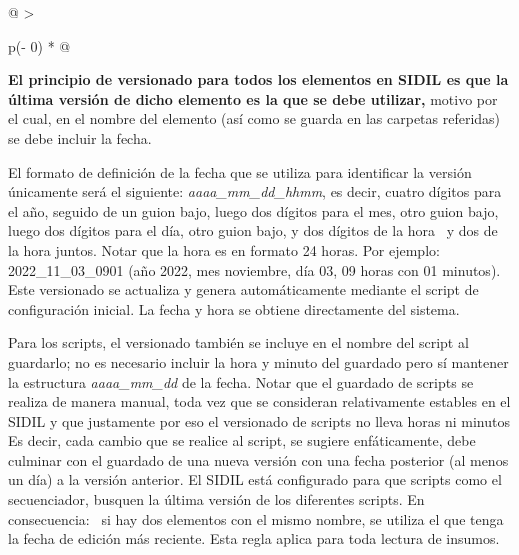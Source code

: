 \documentclass[
]{article}
\begin{document}
\begin{longtable}[]{@{}
  >{\raggedright\arraybackslash}p{(\columnwidth - 0\tabcolsep) * }@{}}
\caption{El versionado de los archivos no solo permite la trazabilidad (ver subsección siguiente) sino que además es indispensable para el funcionamiento adecuado del SIDIL. Dos ejemplos: primero, la lectura de scripts de cálculo de indicadores en el módulo I requiere la identificación de fecha (tan solo para poder aplicarlo, pero además para identificar la versión más reciente). De la misma manera, la interfaz de explotación de datos requiere del adecuado versionado de la MPR para poder identificar la versión más reciente y ofrecer la predicción de riesgos más actualizada.}\tabularnewline
\toprule\noalign{}
\begin{minipage}[b]{\linewidth}\raggedright
\textbf{El principio de versionado para todos los elementos en SIDIL es que la última versión de dicho elemento es la que se debe utilizar,} motivo por el cual, en el nombre del elemento (así como se guarda en las carpetas referidas) se debe incluir la fecha.

El formato de definición de la fecha que se utiliza para identificar la versión únicamente será el siguiente: \emph{aaaa\_mm\_dd\_hhmm}, es decir, cuatro dígitos para el año, seguido de un guion bajo, luego dos dígitos para el mes, otro guion bajo, luego dos dígitos para el día, otro guion bajo, y dos dígitos de la hora~ y dos de la hora juntos. Notar que la hora es en formato 24 horas. Por ejemplo: 2022\_11\_03\_0901 (año 2022, mes noviembre, día 03, 09 horas con 01 minutos). Este versionado se actualiza y genera automáticamente mediante el script de configuración inicial. La fecha y hora se obtiene directamente del sistema.

Para los scripts, el versionado también se incluye en el nombre del script al guardarlo; no es necesario incluir la hora y minuto del guardado pero sí mantener la estructura \emph{aaaa\_mm\_dd} de la fecha. Notar que el guardado de scripts se realiza de manera manual, toda vez que se consideran relativamente estables en el SIDIL y que justamente por eso el versionado de scripts no lleva horas ni minutos Es decir, cada cambio que se realice al script, se sugiere enfáticamente, debe culminar con el guardado de una nueva versión con una fecha posterior (al menos un día) a la versión anterior. El SIDIL está configurado para que scripts como el secuenciador, busquen la última versión de los diferentes scripts. En consecuencia:~ si hay dos elementos con el mismo nombre, se utiliza el que tenga la fecha de edición más reciente. Esta regla aplica para toda lectura de insumos.


\end{minipage}
\end{longtable}
\end{document}
